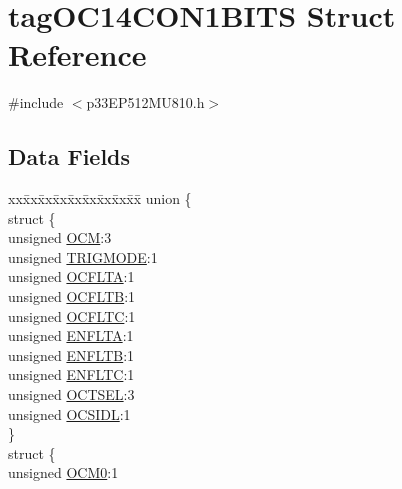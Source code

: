 \hypertarget{structtag_o_c14_c_o_n1_b_i_t_s}{}\section{tag\+O\+C14\+C\+O\+N1\+B\+I\+TS Struct Reference}
\label{structtag_o_c14_c_o_n1_b_i_t_s}


{\ttfamily \#include $<$p33\+E\+P512\+M\+U810.\+h$>$}

\subsection*{Data Fields}
\begin{DoxyCompactItemize}
\item 
\begin{tabbing}
xx\=xx\=xx\=xx\=xx\=xx\=xx\=xx\=xx\=\kill
union \{\\
\>struct \{\\
\>\>unsigned \hyperlink{structtag_o_c14_c_o_n1_b_i_t_s_a778fa0cf51a9477ac4e82d71a8733801}{OCM}:3\\
\>\>unsigned \hyperlink{structtag_o_c14_c_o_n1_b_i_t_s_a7a0057e0dca6e2663584b5b9e1da04c3}{TRIGMODE}:1\\
\>\>unsigned \hyperlink{structtag_o_c14_c_o_n1_b_i_t_s_acc967e41cecdeedc6ad4422f9ef1a6a3}{OCFLTA}:1\\
\>\>unsigned \hyperlink{structtag_o_c14_c_o_n1_b_i_t_s_a1fb30bb4421ef7c4bd0c66c379875593}{OCFLTB}:1\\
\>\>unsigned \hyperlink{structtag_o_c14_c_o_n1_b_i_t_s_a69a1772a4144abd579d17d28445b9934}{OCFLTC}:1\\
\>\>unsigned \hyperlink{structtag_o_c14_c_o_n1_b_i_t_s_a1e0f05fb23d516e003e4713fe8c1498a}{ENFLTA}:1\\
\>\>unsigned \hyperlink{structtag_o_c14_c_o_n1_b_i_t_s_a9d7aa97d5328b8b81ab7fd9145dfa0fc}{ENFLTB}:1\\
\>\>unsigned \hyperlink{structtag_o_c14_c_o_n1_b_i_t_s_a0b6f25c0f83f33b5501b6a2e6141a6ef}{ENFLTC}:1\\
\>\>unsigned \hyperlink{structtag_o_c14_c_o_n1_b_i_t_s_ae37d2a41dae2d2af1d82f7caae33cadb}{OCTSEL}:3\\
\>\>unsigned \hyperlink{structtag_o_c14_c_o_n1_b_i_t_s_afd05f4f249db4ef69b684e2f3fa6b703}{OCSIDL}:1\\
\>\} \\
\>struct \{\\
\>\>unsigned \hyperlink{structtag_o_c14_c_o_n1_b_i_t_s_a9271e84c9759ff10a7bc1cee3276e8f6}{OCM0}:1\\

\end{tabbing}
\end{DoxyCompactItemize}
